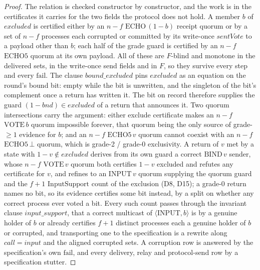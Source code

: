 \begin{proof}\leanok
  The relation is checked constructor by constructor, and the work is in the certificates it carries for the two fields the protocol does not hold.
  A member $b$ of $excluded$ is certified either by an $n{-}f$ $\mathrm{ECHO}\,(1-b)$ receipt quorum or by a set of $n{-}f$ processes each corrupted or committed by its write-once $\mathit{sentVote}$ to a payload other than $b$; each half of the grade guard is certified by an $n{-}f$ $\mathrm{ECHO5}$ quorum at its own payload.
  All of these are $F$-blind and monotone in the delivered sets, in the write-once send fields and in $F$, so they survive every step and every $\mathrm{fail}$.
  The clause $bound\_excluded$ pins $excluded$ as an equation on the round's bound bit: empty while the bit is unwritten, and the singleton of the bit's complement once a return has written it.
  The bit on record therefore supplies the guard $(1-bnd) \in excluded$ of a return that announces it.
  Two quorum intersections carry the argument: either exclude certificate makes an $n{-}f$ $\mathrm{VOTE}\,b$ quorum impossible forever, that quorum being the only source of grade-$\ge 1$ evidence for $b$; and an $n{-}f$ $\mathrm{ECHO5}\,v$ quorum cannot coexist with an $n{-}f$ $\mathrm{ECHO5}\,\bot$ quorum, which is grade-2 / grade-0 exclusivity.
  A return of $v$ met by a state with $1-v \notin excluded$ derives from its own guard a correct $\mathrm{BIND}\,v$ sender, whose $n{-}f$ $\mathrm{VOTE}\,v$ quorum both certifies $1-v$ excluded and refutes any certificate for $v$, and refines to an $\mathrm{INPUT}\,v$ quorum supplying the quorum guard and the $f{+}1$ $\mathrm{InputSupport}$ count of the exclusion (D8, D15); a grade-0 return names no bit, so its evidence certifies some bit instead, by a split on whether any correct process ever voted a bit.
  Every such count passes through the invariant clause $input\_support$, that a correct multicast of $\langle\mathrm{INPUT},b\rangle$ is by a genuine holder of $b$ or already certifies $f{+}1$ distinct processes each a genuine holder of $b$ or corrupted, and transporting one to the specification is a rewrite along $call = \mathit{input}$ and the aligned corrupted sets.
  A corruption row is answered by the specification's own $\mathrm{fail}$, and every delivery, relay and protocol-send row by a specification stutter.
\end{proof}
